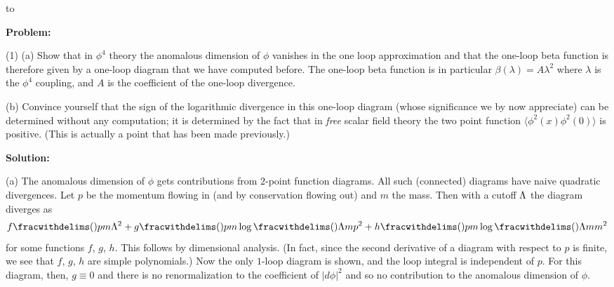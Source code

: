 \def\scrF{{\scr F}}
\def\scrH{{\scr H}}
\def\scrL{{\scr L}}
\def\scrO{{\scr O}}


\document
{}
\smallskip
\hbox to \hsize{\hrulefill}

\bigskip\noindent
{\bf Problem:} 

\smallskip
(1) (a) 
Show that in $\phi^4$ theory the anomalous 
dimension of $\phi$ vanishes
in the one loop approximation and that the one-loop 
beta function is therefore
given by a one-loop diagram that we have computed before.  
The one-loop
beta function is in particular $\beta(\lambda)=A\lambda^2$ 
where $\lambda$ is
the $\phi^4$ coupling, and $A$ is the coefficient of the 
one-loop divergence.

(b) Convince yourself that the sign of the logarithmic 
divergence in this
one-loop diagram (whose significance we by now appreciate) 
can be determined
without any computation; it is determined by the 
fact that in {\it free}
scalar field theory the two point 
function $\langle \phi^2(x)\phi^2(0)\rangle$
is positive.  (This is actually a point that has been 
made previously.)

\bigskip\bigskip\noindent
{\bf Solution:}

\smallskip
\halfspace
\noindent
(a)\enspace
The anomalous dimension of $\phi$ gets contributions from
$2$-point function diagrams.
All such (connected) diagrams have naive quadratic
divergences.
Let $p$ be the momentum flowing in (and by conservation
flowing out) and $m$ the mass.
Then with a cutoff ${\Lambda}$ the diagram diverges as
$$
f\fracwithdelims()pm
\Lam^2+g\fracwithdelims()pm
\log\fracwithdelims()\Lam m
p^2+h\fracwithdelims()pm\log\fracwithdelims()\Lam m
m^2
$$
for some functions $f$, $g$, $h$.
This follows by dimensional analysis.
(In fact, since the second derivative of a diagram with
respect to $p$ is finite, we see that $f$, $g$, $h$ are
simple polynomials.)
Now the only $1$-loop diagram is shown, and the loop
integral is
\noindent
independent of $p$.
For this diagram, then, $g\equiv 0$ and there is no
renormalization to the coefficient of $\vert
d\phi\vert^2$ and so no contribution to the anomalous
dimension of $\phi$.

